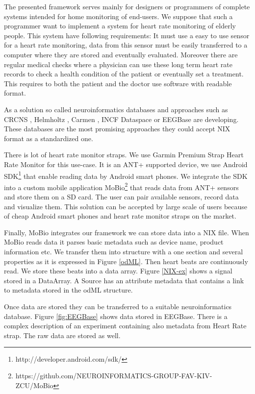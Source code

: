 \documentclass[conference]{IEEEconf}
\begin{document}
The presented framework serves mainly for designers or programmers of complete systems intended for home monitoring of end-users. We suppose that such a programmer want to implement a system for heart rate monitoring of elderly people. This system have following requirements: It must use a easy to use sensor for a heart rate monitoring, data from this sensor must be easily transferred to a computer where they are stored and eventually evaluated. Moreover there are regular medical checks where a physician can use these long term heart rate records to check a health condition of the patient or eventually set a treatment. This requires to both the patient and the doctor use software with readable format. 

As a solution so called neuroinformatics databases and approaches such as CRCNS \cite{CRCNS}, Helmholtz \cite{10.3389/conf.fninf.2013.09.00025}, Carmen \cite{fgibson:Watson2007},  INCF Dataspace \cite{dataspace} or EEGBase \cite{ISI:000306821100004} are developing. These databases are the most promising approaches they could accept NIX format as a standardized one.

There is lot of heart rate monitor straps. We use Garmin Premium Strap Heart Rate Monitor for this use-case. It is an ANT+ supported device, we use Android SDK\footnote{http://developer.android.com/sdk/} that enable reading data by Android smart phones. We integrate the SDK into a custom mobile application MoBio\footnote{https://github.com/NEUROINFORMATICS-GROUP-FAV-KIV-ZCU/MoBio} that reads data from ANT+ sensors and store them on a SD card. The user can pair available sensors, record data and visualize them. This solution can be accepted by large scale of users because of cheap Android smart phones and heart rate monitor straps on the market.

Finally, MoBio integrates our framework we can store data into a NIX file. When MoBio reads data it parses basic metadata such as device name, product information etc. We transfer them into structure with a one section and several properties as it is expressed in Figure \ref{odML}. Then heart beats are continuously read. We store these beats into a data array. Figure \ref{NIX-ex} shows a signal stored in a DataArray. A Source has an attribute metadata that contains a link to metadata stored in the odML structure.

Once data are stored they can be transferred to a suitable neuroinformatics database. Figure \ref{fig:EEGBase} shows data stored in EEGBase. There is a complex description of an experiment containing also metadata from Heart Rate strap. The raw data are stored as well.
\end{document}
